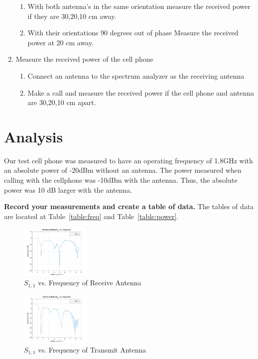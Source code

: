 \documentclass[journal]{IEEEtran}
\begin{document}
\begin{enumerate}
\begin{enumerate}
              \item With both antenna's in the same orientation measure the received power if they are 30,20,10 cm away.
              \item With their orientations 90 degrees out of phase Measure the received power at 20 cm away.
          \end{enumerate}
    \item Measure the received power of the cell phone
          \begin{enumerate}
              \item Connect an antenna to the spectrum analyzer as the receiving antenna
              \item Make a call  and measure the received power if the cell phone and antenna are 30,20,10 cm apart.
          \end{enumerate}
\end{enumerate}

\section{Analysis}
Our test cell phone was measured to have an operating frequency of 1.8GHz with
an absolute power of -20dBm without an antenna. The power measured when calling
with the cellphone was -10dBm with the antenna. Thus, the absolute power was 10
dB larger with the antenna.

\textbf{ Record your measurements and create a table of data.}
The tables of data are located at Table~\ref{table:freq} and Table~\ref{table:power}.

\begin{figure}[hp]
    \centering
    \includegraphics[width=0.3\textwidth]{receive_rl.png}

    \caption{\label{fig:recv} \(S_{1,1}\) vs. Frequency of Receive Antenna}
\end{figure}

\begin{figure}[hp]
    \centering
    \includegraphics[width=0.3\textwidth]{transmit_rl.png}

    \caption{\label{fig:transmit} \(S_{1,1}\) vs. Frequency of Transmit Antenna}
\end{figure}
\end{document}
